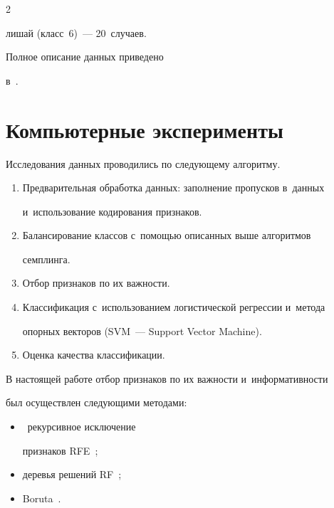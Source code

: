 \begin{multicols}{2}
\begin{itemize}
лишай (класс~6)~--- 20~случаев.

\end{itemize}

 Полное описание данных приведено 

в~\cite{11-sev}.

  

\section{Компьютерные эксперименты}



  Исследования данных проводились по сле\-ду\-юще\-му алгоритму.

  \begin{enumerate}[1.]

\item Предварительная обработка данных: заполнение пропусков в~данных 

и~использование кодирования признаков. 

\item Балансирование классов с~помощью описанных выше алгоритмов 

семплинга.

\item Отбор признаков по их важности. 

\item Классификация с~использованием логистической регрессии и~метода 

опорных векторов (SVM~--- Support Vector Machine).

\item Оценка качества классификации.

\end{enumerate}



  В настоящей работе отбор признаков по их важности и~информативности 

был осуществлен следующими методами:

\begin{itemize}

\item[(а)]~рекурсивное исключение 

признаков RFE~\cite{9-sev}; 

\item[(б)] деревья решений RF~\cite{10-sev}; 

\item[(в)] Boruta~\cite{4-sev}.


\end{itemize}
\end{multicols}
